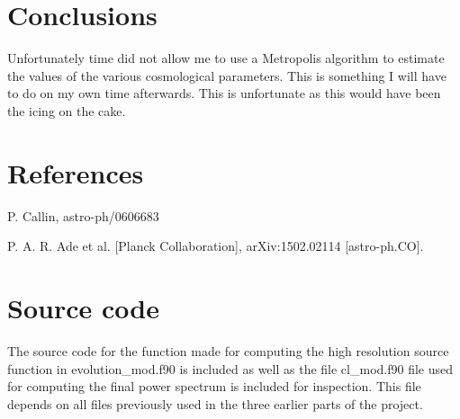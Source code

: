 \documentclass[a4paper]{report}
\begin{document}
\section{Conclusions}\label{sec:Conc}
Unfortunately time did not allow me to use a Metropolis algorithm to estimate the values of the various cosmological parameters. This is something I will have to do on my own time afterwards. This is unfortunate as this would have been the icing on the cake.


\section{References}
\begin{enumerate}[label= {[}\arabic*{]} ]
 \item P. Callin, astro-ph/0606683
 \item P. A. R. Ade et al. [Planck Collaboration], arXiv:1502.02114 [astro-ph.CO].
 
\end{enumerate}

\onecolumn 
\section{Source code}\label{sec:files}
The source code for the function made for computing the high resolution source function in evolution\_mod.f90 is included as well as the file cl\_mod.f90 file used for computing the final power spectrum is included for inspection. This file depends on all files previously used in the three earlier parts of the project.



\end{document}

